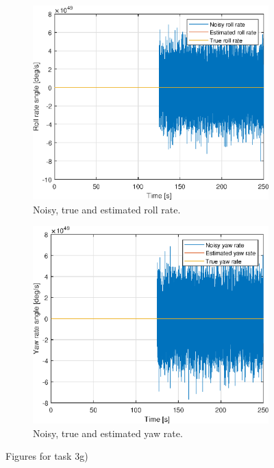 \begin{figure}[ht]
    \begin{subfigure}[b]{0.45\textwidth}
		\includegraphics[width=\textwidth]{figures/3g/roll_rate_p.eps}
		\caption{Noisy, true and estimated roll rate. }
		\label{fig:3g_roll_rate_p}
	\end{subfigure}
	\begin{subfigure}[b]{0.45\textwidth}
		\includegraphics[width=\textwidth]{figures/3g/yaw_rate_r.eps}
		\caption{Noisy, true and estimated yaw rate. }
		\label{fig:3g_yaw_rate_r}
	\end{subfigure}		
	\caption{Figures for task 3g)}\label{fig:3g}
\end{figure}
